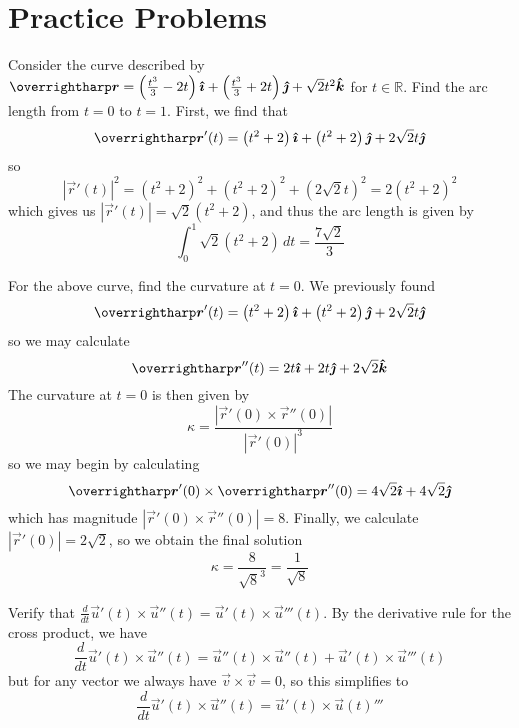 \documentclass[../main.tex]{subfiles}
\begin{document}
        \section{Practice Problems}
        \begin{example}{}{}
                Consider the curve described by \(\vec{r}=\left(\frac{t^3}{3}-2t\right)\i + \left(\frac{t^3}{3}+2t\right)\j + \sqrt{2}t^2\k\) for \(t\in\mathbb{R}\). Find the arc length from \(t=0\) to \(t=1\).
                \tcblower
                First, we find that
                \[
                \vec{r}'(t)=\left(t^2+2\right)\i + \left(t^2+2\right)\j +2\sqrt{2}t\j
                \]
                so
                \[
                |\vec{r}'(t)|^2=\left(t^2+2\right)^2 + \left(t^2+2\right)^2 +(2\sqrt{2}t)^2 = 2\left(t^2+2\right)^2
                \]
                which gives us \(|\vec{r}'(t)|=\sqrt{2}(t^2+2)\), and thus the arc length is given by
                \[
                \int_0^1\sqrt{2}(t^2+2)\,dt = \frac{7\sqrt{2}}{3}
                \]
        \end{example}
        \begin{example}{}{}
                For the above curve, find the curvature at \(t=0\).
                \tcblower
                We previously found
                \[
                \vec{r}'(t)=\left(t^2+2\right)\i + \left(t^2+2\right)\j +2\sqrt{2}t\j
                \]
                so we may calculate
                \[
                \vec{r}''(t)=2t\i + 2t\j + 2\sqrt{2}\k
                \]
                The curvature at \(t=0\) is then given by
                \[
                \kappa = \frac{|\vec{r}'(0)\times\vec{r}''(0)|}{|\vec{r}'(0)|^3}
                \]
                so we may begin by calculating
                \[
                \vec{r}'(0)\times\vec{r}''(0)=4\sqrt{2}\i+4\sqrt{2}\j
                \]
                which has magnitude \(|\vec{r}'(0)\times\vec{r}''(0)|=8\). Finally, we calculate \(|\vec{r}'(0)|=2\sqrt{2}\), so we obtain the final solution
                \[
                \kappa = \frac{8}{\sqrt{8}^3}=\frac{1}{\sqrt{8}}
                \]
        \end{example}
        \begin{example}{}{}
                Verify that \(\frac{d}{dt}\vec{u}'(t)\times\vec{u}''(t)=\vec{u}'(t)\times\vec{u}'''(t)\).
                \tcblower
                By the derivative rule for the cross product, we have
                \[
                \frac{d}{dt}\vec{u}'(t)\times\vec{u}''(t)=\vec{u}''(t)\times\vec{u}''(t) + \vec{u}'(t)\times\vec{u}'''(t)
                \]
                but for any vector we always have \(\vec{v}\times\vec{v}=0\), so this simplifies to
                \[
                \frac{d}{dt}\vec{u}'(t)\times\vec{u}''(t)=\vec{u}'(t)\times\vec{u}(t)'''
                \]
        \end{example}
\end{document}
